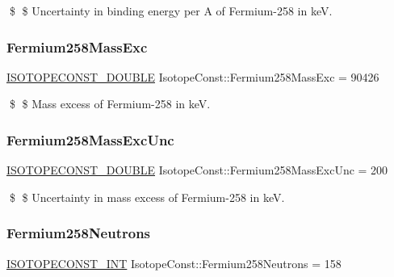 \$ \$ Uncertainty in binding energy per A of Fermium-\/258 in keV. \mbox{\label{group___isotope_const-_fermium-_fm258_ga9c382c2a2ec8a3160878473bfff35c92}} 
\subsubsection{\texorpdfstring{Fermium258\+Mass\+Exc}{Fermium258MassExc}}
{\footnotesize\ttfamily \mbox{\hyperlink{group___isotope_const-_macros_ga8f45a7272ce02c0b4c65c44636ed719a}{I\+S\+O\+T\+O\+P\+E\+C\+O\+N\+S\+T\+\_\+\+D\+O\+U\+B\+LE}} Isotope\+Const\+::\+Fermium258\+Mass\+Exc = 90426}

\$ \$ Mass excess of Fermium-\/258 in keV. \mbox{\label{group___isotope_const-_fermium-_fm258_ga606f2a76ce2dded186852b2d1a34f031}} 
\subsubsection{\texorpdfstring{Fermium258\+Mass\+Exc\+Unc}{Fermium258MassExcUnc}}
{\footnotesize\ttfamily \mbox{\hyperlink{group___isotope_const-_macros_ga8f45a7272ce02c0b4c65c44636ed719a}{I\+S\+O\+T\+O\+P\+E\+C\+O\+N\+S\+T\+\_\+\+D\+O\+U\+B\+LE}} Isotope\+Const\+::\+Fermium258\+Mass\+Exc\+Unc = 200}

\$ \$ Uncertainty in mass excess of Fermium-\/258 in keV. \mbox{\label{group___isotope_const-_fermium-_fm258_gab51ed0aeef3e3e41e9450b7a2d2b4799}} 
\subsubsection{\texorpdfstring{Fermium258\+Neutrons}{Fermium258Neutrons}}
{\footnotesize\ttfamily \mbox{\hyperlink{group___isotope_const-_macros_ga5f18360b3e99483a35c32d789e62621c}{I\+S\+O\+T\+O\+P\+E\+C\+O\+N\+S\+T\+\_\+\+I\+NT}} Isotope\+Const\+::\+Fermium258\+Neutrons = 158}

